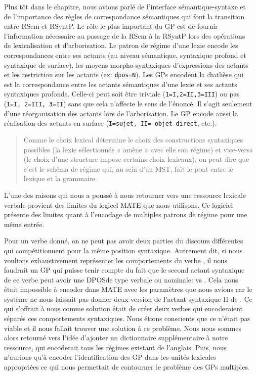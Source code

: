 Plus tôt dans le chapitre, nous avions parlé de l'interface sémantique-syntaxe et de l'importance des règles de correspondance sémantiques qui font la transition entre \ac{RSem} et \ac{RSyntP}. Le rôle le plus important du \ac{GP} est de fournir l'information nécessaire au passage de la \ac{RSem} à la \ac{RSyntP} lors des opérations de lexicalisation et d’arborisation. Le patron de régime d'une lexie encode les correspondances entre ses actants (au niveau sémantique, syntaxique profond et syntaxique de surface), les moyens morpho-syntaxiques d'expressions des actants et les restriction sur les actants (ex: \texttt{dpos=N}). Les \acp{GP} encodent la diathèse qui est la correspondance entre les actants sémantiques d'une lexie et ses actants syntaxiques profonds. Celle-ci peut soit être triviale (\texttt{1=I,2=II,3=III}) ou pas (\texttt{1=I, 2=III, 3=II}) sans que cela n'affecte le sens de l'énoncé. Il s'agit seulement d'une réorganisation des actants lors de l'arborisation. Le \ac{GP} encode aussi la réalisation des actants en surface (\texttt{I=sujet, II= objet direct}, etc.).

\begin{quote}
Comme le choix lexical détermine le choix des constructions syntaxiques possibles (la lexie sélectionnée « amène » avec elle son régime) et vice-versa (le choix d’une structure impose certains choix lexicaux), on peut dire que c’est le schéma de régime qui, au sein d’un MST, fait le pont entre le lexique et la grammaire.
\end{quote}
\vspace{-\baselineskip}
\hfill
\cite[p.~105]{MilicevicSchemaregimepont2009}

L'une des raisons qui nous a poussé à nous retourner vers une ressource lexicale verbale provient des limites du logicel MATE \citep{BohnetDevelopmentEnvironmentMTTbased2000a,BOHNET10,bohnet07} que nous utilisons. Ce logiciel présente des limites quant à l'encodage de multiples patrons de régime pour une même entrée.

Pour un verbe donné, on ne peut pas avoir deux parties du discours différentes qui compétitionnent pour la même position syntaxique. Autrement dit, si nous voulions exhaustivement représenter les comportements du verbe , il nous faudrait un \ac{GP} qui puisse tenir compte du fait que le second actant syntaxique de ce verbe peut avoir une \ac{DPOS}de type verbale ou nominale:  vs . Cela nous était impossible à encoder dans MATE avec les paramètres que nous avions car le système ne nous laissait pas donner deux version de l'actant syntaxique II de . Ce qui s'offrait à nous comme solution était de créer deux verbes  qui encoderaient séparés ces comportements syntaxiques. Nous étions conscients que ce n'était pas viable et il nous fallait trouver une solution à ce problème. Nous nous sommes alors retourné vers l'idée d'ajouter un dictionnaire supplémentaire à notre ressource, qui encoderait tous les régimes existant de l'anglais. Puis, nous n'aurions qu'à encoder l'identification des \ac{GP} dans les unités lexicales appropriées ce qui nous permettait de contourner le problème des \acp{GP} multiples.

